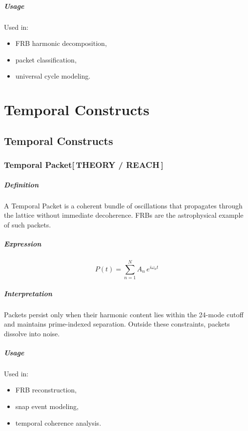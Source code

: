 \documentclass[12pt,oneside]{book}
\newcommand{\TheoryTag}{\;\colorbox{theorytag!15}{\textcolor{theorytag}{\footnotesize\bfseries [\,THEORY / REACH\,]}}}
\begin{document}
\subsubsection{Usage}
Used in:
\begin{itemize}
    \item FRB harmonic decomposition,
    \item packet classification,
    \item universal cycle modeling.
\end{itemize}


\part{Temporal Constructs}
\chapter{Temporal Constructs}

\section{Temporal Packet\TheoryTag}

\subsubsection{Definition}
A Temporal Packet is a coherent bundle of oscillations that propagates through the lattice
without immediate decoherence. FRBs are the astrophysical example of such packets.

\subsubsection{Expression}


\[
P(t) = \sum_{n=1}^{N} A_n \, e^{i \omega_n t}
\]



\subsubsection{Interpretation}
Packets persist only when their harmonic content lies within the 24-mode cutoff and maintains
prime-indexed separation. Outside these constraints, packets dissolve into noise.

\subsubsection{Usage}
Used in:
\begin{itemize}
    \item FRB reconstruction,
    \item snap event modeling,
    \item temporal coherence analysis.
\end{itemize}
\end{document}
